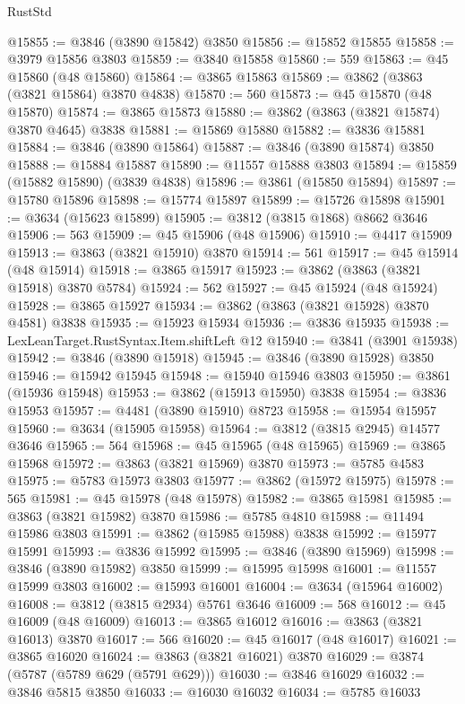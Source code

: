 \begin{lexlean}{RustStd}
\begin{coremodule}
@15855 := @3846 (@3890 @15842) @3850
@15856 := @15852 @15855
@15858 := @3979 @15856 @3803
@15859 := @3840 @15858
@15860 := 559
@15863 := @45 @15860 (@48 @15860)
@15864 := @3865 @15863
@15869 := @3862 (@3863 (@3821 @15864) @3870 @4838)
@15870 := 560
@15873 := @45 @15870 (@48 @15870)
@15874 := @3865 @15873
@15880 := @3862 (@3863 (@3821 @15874) @3870 @4645) @3838
@15881 := @15869 @15880
@15882 := @3836 @15881
@15884 := @3846 (@3890 @15864)
@15887 := @3846 (@3890 @15874) @3850
@15888 := @15884 @15887
@15890 := @11557 @15888 @3803
@15894 := @15859 (@15882 @15890) (@3839 @4838)
@15896 := @3861 (@15850 @15894)
@15897 := @15780 @15896
@15898 := @15774 @15897
@15899 := @15726 @15898
@15901 := @3634 (@15623 @15899)
@15905 := @3812 (@3815 @1868) @8662 @3646
@15906 := 563
@15909 := @45 @15906 (@48 @15906)
@15910 := @4417 @15909
@15913 := @3863 (@3821 @15910) @3870
@15914 := 561
@15917 := @45 @15914 (@48 @15914)
@15918 := @3865 @15917
@15923 := @3862 (@3863 (@3821 @15918) @3870 @5784)
@15924 := 562
@15927 := @45 @15924 (@48 @15924)
@15928 := @3865 @15927
@15934 := @3862 (@3863 (@3821 @15928) @3870 @4581) @3838
@15935 := @15923 @15934
@15936 := @3836 @15935
@15938 := LexLeanTarget.RustSyntax.Item.shiftLeft @12
@15940 := @3841 (@3901 @15938)
@15942 := @3846 (@3890 @15918)
@15945 := @3846 (@3890 @15928) @3850
@15946 := @15942 @15945
@15948 := @15940 @15946 @3803
@15950 := @3861 (@15936 @15948)
@15953 := @3862 (@15913 @15950) @3838
@15954 := @3836 @15953
@15957 := @4481 (@3890 @15910) @8723
@15958 := @15954 @15957
@15960 := @3634 (@15905 @15958)
@15964 := @3812 (@3815 @2945) @14577 @3646
@15965 := 564
@15968 := @45 @15965 (@48 @15965)
@15969 := @3865 @15968
@15972 := @3863 (@3821 @15969) @3870
@15973 := @5785 @4583
@15975 := @5783 @15973 @3803
@15977 := @3862 (@15972 @15975)
@15978 := 565
@15981 := @45 @15978 (@48 @15978)
@15982 := @3865 @15981
@15985 := @3863 (@3821 @15982) @3870
@15986 := @5785 @4810
@15988 := @11494 @15986 @3803
@15991 := @3862 (@15985 @15988) @3838
@15992 := @15977 @15991
@15993 := @3836 @15992
@15995 := @3846 (@3890 @15969)
@15998 := @3846 (@3890 @15982) @3850
@15999 := @15995 @15998
@16001 := @11557 @15999 @3803
@16002 := @15993 @16001
@16004 := @3634 (@15964 @16002)
@16008 := @3812 (@3815 @2934) @5761 @3646
@16009 := 568
@16012 := @45 @16009 (@48 @16009)
@16013 := @3865 @16012
@16016 := @3863 (@3821 @16013) @3870
@16017 := 566
@16020 := @45 @16017 (@48 @16017)
@16021 := @3865 @16020
@16024 := @3863 (@3821 @16021) @3870
@16029 := @3874 (@5787 (@5789 @629 (@5791 @629)))
@16030 := @3846 @16029
@16032 := @3846 @5815 @3850
@16033 := @16030 @16032
@16034 := @5785 @16033

\end{coremodule}
\end{lexlean}
